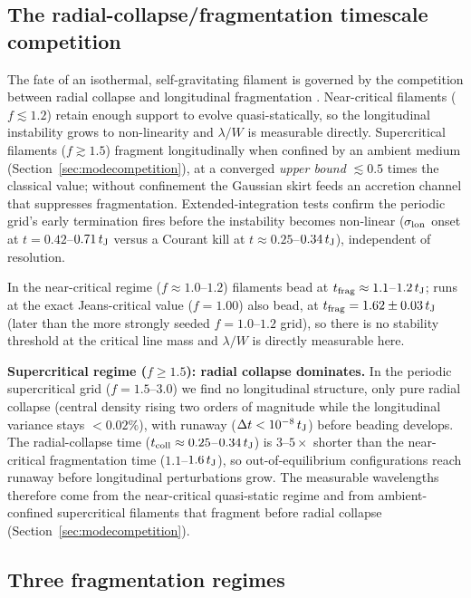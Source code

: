 \documentclass[usenatbib,twoside,twocolumn]{mnras}
\begin{document}
\subsection{The radial-collapse/fragmentation timescale competition}
\label{sec:regimes}

The fate of an isothermal, self-gravitating filament is governed by the competition between radial collapse and longitudinal fragmentation \citep{Inutsuka1997,Pon2012}. Near-critical filaments ($f\lesssim1.2$) retain enough support to evolve quasi-statically, so the longitudinal instability grows to non-linearity and $\lambda/W$ is measurable directly. Supercritical filaments ($f\gtrsim1.5$) fragment longitudinally when confined by an ambient medium (Section~\ref{sec:modecompetition}), at a converged \emph{upper bound} $\lesssim0.5$ times the classical value; without confinement the Gaussian skirt feeds an accretion channel that suppresses fragmentation. Extended-integration tests confirm the periodic grid's early termination fires before the instability becomes non-linear ($\sigma_{\rm lon}$ onset at $t=0.42$--$0.71\,t_{\rm J}$ versus a Courant kill at $t\approx0.25$--$0.34\,t_{\rm J}$), independent of resolution.

In the near-critical regime ($f\approx1.0$--$1.2$) filaments bead at $t_{\rm frag}\approx1.1$--$1.2\,t_{\rm J}$; runs at the exact Jeans-critical value ($f=1.00$) also bead, at $t_{\rm frag}=1.62\pm0.03\,t_{\rm J}$ (later than the more strongly seeded $f=1.0$--$1.2$ grid), so there is no stability threshold at the critical line mass and $\lambda/W$ is directly measurable here.

\textbf{Supercritical regime ($f\geq1.5$): radial collapse dominates.} In the periodic supercritical grid ($f=1.5$--$3.0$) we find no longitudinal structure, only pure radial collapse (central density rising two orders of magnitude while the longitudinal variance stays $<0.02\%$), with runaway ($\Delta t<10^{-8}\,t_{\rm J}$) before beading develops. The radial-collapse time ($t_{\rm coll}\approx0.25$--$0.34\,t_{\rm J}$) is $3$--$5\times$ shorter than the near-critical fragmentation time ($1.1$--$1.6\,t_{\rm J}$), so out-of-equilibrium configurations reach runaway before longitudinal perturbations grow. The measurable wavelengths therefore come from the near-critical quasi-static regime and from ambient-confined supercritical filaments that fragment before radial collapse (Section~\ref{sec:modecompetition}).

\subsection{Three fragmentation regimes}
\end{document}
